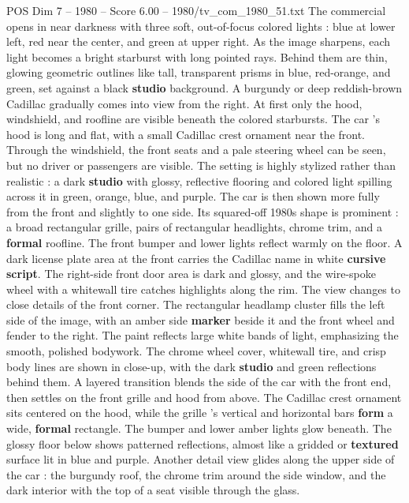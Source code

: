 \begin{textsample}{POS Dim 7 – 1980 – Score 6.00 – 1980/tv\_com\_1980\_51.txt}  \label{ex:f7_pos_046}
The commercial opens in near darkness with three soft, out-of-focus colored lights : blue at lower left, red near the center, and green at upper right.
As the image sharpens, each light becomes a bright starburst with long pointed rays.
Behind them are thin, glowing geometric outlines like tall, transparent prisms in blue, red-orange, and green, set against a black \textbf{studio} background.
A burgundy or deep reddish-brown Cadillac gradually comes into view from the right.
At first only the hood, windshield, and roofline are visible beneath the colored starbursts.
The car ’s hood is long and flat, with a small Cadillac crest ornament near the front.
Through the windshield, the front seats and a pale steering wheel can be seen, but no driver or passengers are visible.
The setting is highly stylized rather than realistic : a dark \textbf{studio} with glossy, reflective flooring and colored light spilling across it in green, orange, blue, and purple.
The car is then shown more fully from the front and slightly to one side.
Its squared-off 1980s shape is prominent : a broad rectangular grille, pairs of rectangular headlights, chrome trim, and a \textbf{formal} roofline.
The front bumper and lower lights reflect warmly on the floor.
A dark license plate area at the front carries the Cadillac name in white \textbf{cursive} \textbf{script}.
The right-side front door area is dark and glossy, and the wire-spoke wheel with a whitewall tire catches highlights along the rim.
The view changes to close details of the front corner.
The rectangular headlamp cluster fills the left side of the image, with an amber side \textbf{marker} beside it and the front wheel and fender to the right.
The paint reflects large white bands of light, emphasizing the smooth, polished bodywork.
The chrome wheel cover, whitewall tire, and crisp body lines are shown in close-up, with the dark \textbf{studio} and green reflections behind them.
A layered transition blends the side of the car with the front end, then settles on the front grille and hood from above.
The Cadillac crest ornament sits centered on the hood, while the grille ’s vertical and horizontal bars \textbf{form} a wide, \textbf{formal} rectangle.
The bumper and lower amber lights glow beneath.
The glossy floor below shows patterned reflections, almost like a gridded or \textbf{textured} surface lit in blue and purple.
Another detail view glides along the upper side of the car : the burgundy roof, the chrome trim around the side window, and the dark interior with the top of a seat visible through the glass.

\end{textsample}

